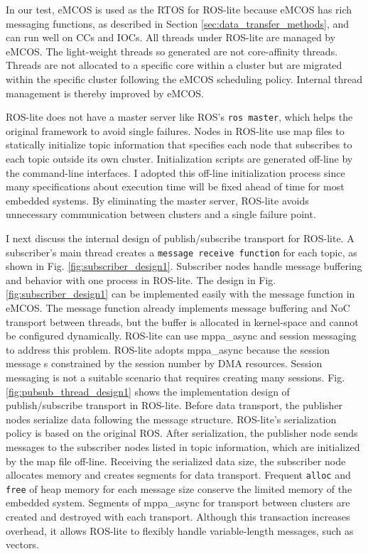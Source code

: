 In our test, eMCOS is used as the RTOS for ROS-lite because eMCOS has rich messaging functions, as described in Section \ref{sec:data_transfer_methods}, and can run well on CCs and IOCs.
All threads under ROS-lite are managed by eMCOS.
The light-weight threads so generated are not core-affinity threads.
Threads are not allocated to a specific core within a cluster but are migrated within the specific cluster following the eMCOS scheduling policy.
Internal thread management is thereby improved by eMCOS.

ROS-lite does not have a master server like ROS’s \texttt{ros master}, which helps the original framework to avoid single failures. Nodes in ROS-lite use map files to statically initialize topic information that specifies each node that subscribes to each topic outside its own cluster.
Initialization scripts are generated off-line by the command-line interfaces.
I adopted this off-line initialization process since many specifications about execution time will be fixed ahead of time for most embedded systems.
By eliminating the master server, ROS-lite avoids unnecessary communication between clusters and a single failure point.

I next discuss the internal design of publish/subscribe transport for ROS-lite.
A subscriber's main thread creates a \texttt{message receive function} for each topic, as shown in Fig. \ref{fig:subscriber_design1}.
Subscriber nodes handle message buffering and behavior with one process in ROS-lite.
The design in Fig. \ref{fig:subscriber_design1} can be implemented easily with the message function in eMCOS.
The message function already implements message buffering and NoC transport between threads, but the buffer is allocated in kernel-space and cannot be configured dynamically.
ROS-lite can use mppa\_async and session messaging to address this problem.
ROS-lite adopts mppa\_async because the session message s constrained by the session number by DMA resources.
Session messaging is not a suitable scenario that requires creating many sessions.
Fig. \ref{fig:pubsub_thread_design1} shows the implementation design of publish/subscribe transport in ROS-lite.
Before data transport, the publisher nodes serialize data following the message structure.
ROS-lite's serialization policy is based on the original ROS.
After serialization, the publisher node sends messages to the subscriber nodes listed in topic information, which are initialized by the map file off-line.
Receiving the serialized data size, the subscriber node allocates memory and creates segments for data transport.
Frequent \texttt{alloc} and \texttt{free} of heap memory for each message size conserve the limited memory of the embedded system.
Segments of mppa\_async for transport between clusters are created and destroyed with each transport.
Although this transaction increases overhead, it allows ROS-lite to flexibly handle variable-length messages, such as vectors.

